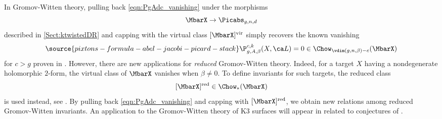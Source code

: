 In Gromov-Witten theory,  pulling back \eqref{eqn:PgAdc_vanishing} under the morphisms $$\MbarX \to \Picabs_{g,n,d}$$ described in  \cref{Sect:ktwistedDR} and capping with the virtual class $[\MbarX]^\textup{vir}$ simply recovers the known vanishing
\begin{equation} \label{eqn:PXbetavanishing}
\source{pixtons-formula-abel-jacobi-picard-stack}
    \P_{g,A,\beta}^{c,k}(X,\ca L) = 0 \in \Chow_{\vdim(g,n,\beta)-c}(\MbarX)
\end{equation}
for $c>g$ proven in \cite{Bae}. However, there are new applications for \emph{reduced} Gromov-Witten theory. Indeed, for a target $X$ having a nondegenerate holomorphic $2$-form, the virtual class of $\MbarX$ vanishes when $\beta \neq 0$.
To define invariants for such targets, the reduced class
\[[\MbarX]^\textup{red} \in \Chow_{*}(\MbarX)\]
is used instead, see \cite{bryanleung,maulikpandharipande}. By
pulling back \eqref{eqn:PgAdc_vanishing} and capping with $[\MbarX]^\textup{red}$, we obtain new relations among reduced Gromov-Witten invariants. An application to the Gromov-Witten theory of K3 surfaces will appear in \cite{BaeBuelles} related to
conjectures of \cite{ObPand}.







\def\cprime{$'$}


